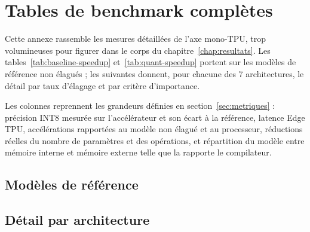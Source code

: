 
\chapter{Tables de benchmark complètes}
\label{ann:tables}

Cette annexe rassemble les mesures détaillées de l'axe mono-TPU, trop
volumineuses pour figurer dans le corps du chapitre~\ref{chap:resultats}. Les
tables~\ref{tab:baseline-speedup} et~\ref{tab:quant-speedup} portent sur les
modèles de référence non élagués ; les suivantes donnent, pour chacune des 7
architectures, le détail par taux d'élagage et par critère d'importance.

Les colonnes reprennent les grandeurs définies en section~\ref{sec:metriques} :
précision INT8 mesurée sur l'accélérateur et son écart à la référence, latence
Edge TPU, accélérations rapportées au modèle non élagué et au processeur,
réductions réelles du nombre de paramètres et des opérations, et répartition du
modèle entre mémoire interne et mémoire externe telle que la rapporte le
compilateur.

\section{Modèles de référence}

{\footnotesize


}

\clearpage
\section{Détail par architecture}

\renewcommand{\benchscale}{0.70}

\clearpage
\renewcommand{\benchscale}{0.70}

\clearpage
\renewcommand{\benchscale}{0.78}

\clearpage
\renewcommand{\benchscale}{0.72}

\clearpage
\renewcommand{\benchscale}{0.82}

\clearpage
\renewcommand{\benchscale}{0.70}

\clearpage
\renewcommand{\benchscale}{0.88}

